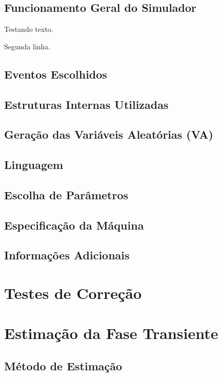 \documentclass[a4paper,12pt]{report}
\begin{document}
\section{Funcionamento Geral do Simulador}
Testando texto.

Segunda linha.

\section{Eventos Escolhidos}

\section{Estruturas Internas Utilizadas}

\section{Geração das Variáveis Aleatórias (VA)}

\section{Linguagem}

\section{Escolha de Parâmetros}

\section{Especificação da Máquina}

\section{Informações Adicionais}

\chapter{Testes de Correção}

\chapter{Estimação da Fase Transiente}

\section{Método de Estimação}
\end{document}
